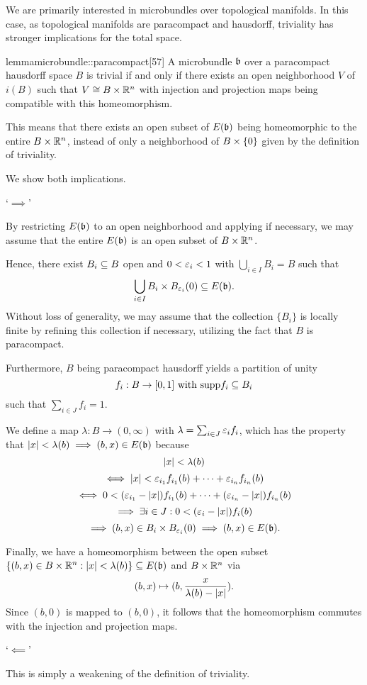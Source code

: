 
\begin{myparagraph} We are primarily interested in microbundles over topological manifolds. In this case, as topological manifolds are paracompact and hausdorff, triviality has stronger implications for the total space. \end{myparagraph}

\begin{mystatement}{lemma}{microbundle::paracompact}[57] A microbundle $\bb$ over a paracompact hausdorff space $B$ is trivial if and only if there exists an open neighborhood $V$ of $i(B)$ such that $V \cong B \times \mathbb{R}^n$ with injection and projection maps being compatible with this homeomorphism. \end{mystatement}

\begin{myparagraph} This means that there exists an open subset of $E(\bb)$ being homeomorphic to the entire $B \times \mathbb{R}^n$, instead of only a neighborhood of $B \times{} \{0\}$ given by the definition of triviality. \end{myparagraph}

\begin{myproof} We show both implications.

`$\implies$'

By restricting $E(\bb)$ to an open neighborhood and applying  if necessary, we may assume that the entire $E(\bb)$ is an open subset of $B \times \mathbb{R}^n$.

Hence, there exist $B_i \subseteq{} B$ open and $0 < \varepsilon{}_i < 1$ with $\bigcup_{i \in I} B_i = B$ such that \[ \bigcup_{i \in I } B_i \cross \ball[\eps_i] \sub E(\bb). \] Without loss of generality, we may assume that the collection $\{B_i\}$ is locally finite by refining this collection if necessary, utilizing the fact that $B$ is paracompact.

Furthermore, $B$ being paracompact hausdorff yields a partition of unity \[ f_i: B \to [0, 1] \text{ with } \text{supp}{f_i} \subseteq{} B_i\] such that $\sum_{i \in J}f_i = 1$.

We define a map $\lambda: B \to (0, \infty)$ with $\lambda = \sum_{i \in J} \varepsilon{}_i f_i$, which has the property that $\abs{x} < \lambda(b) \implies (b, x) \in E(\bb)$ because \[ \vert{} x \vert{} < \lambda(b) \] \[ \iff \vert{} x \vert{} < \varepsilon{}_{i_1} f_{i_1}(b) + \cdots + \varepsilon{}_{i_n} f_{i_n}(b) \] \[ \iff 0 < (\varepsilon{}_{i_1} - \vert{} x \vert{}) f_{i_1}(b) + \cdots + (\varepsilon{}_{i_n} - \vert{} x \vert{}) f_{i_n}(b) \] \[ \implies \exists i \in J: 0 < (\varepsilon{}_{i} - \vert{} x \vert{}) f_{i}(b) \] \[ \implies (b, x) \in B_i \cross \ball[\eps_i] \implies (b, x) \in E(\bb). \]

Finally, we have a homeomorphism between the open subset $\set{(b, x) \in B \cross \R^n}{\abs{x} < \lambda(b)} \sub E(\bb)$ and $B \times \mathbb{R}^n$ via \[ (b, x) \mapsto (b, \frac{x}{\lambda(b) - \vert{} x \vert{}}). \] Since $(b, 0)$ is mapped to $(b, 0)$, it follows that the homeomorphism commutes with the injection and projection maps.

`$\impliedby$'

This is simply a weakening of the definition of triviality. \end{myproof}